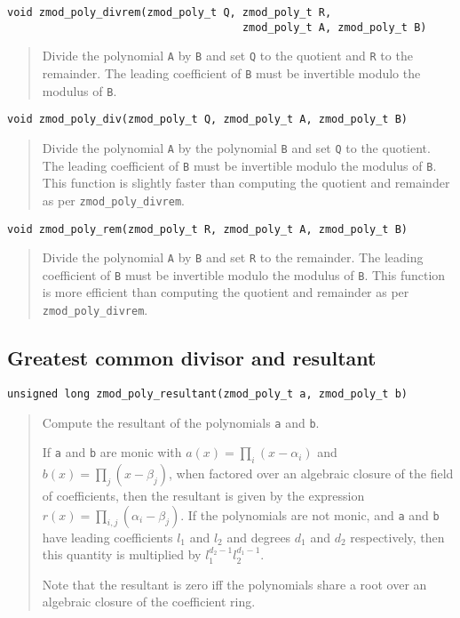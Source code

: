 \documentclass[a4paper,10pt]{article}
\newcommand{\code}{\lstinline}
\begin{document}
\begin{lstlisting}
void zmod_poly_divrem(zmod_poly_t Q, zmod_poly_t R, 
                                     zmod_poly_t A, zmod_poly_t B)
\end{lstlisting}
\begin{quote}
Divide the polynomial \code{A} by \code{B} and set \code{Q} to the quotient and \code{R} to the remainder. The leading coefficient of \code{B} must be invertible modulo the modulus of \code{B}.
\end{quote}

\begin{lstlisting}
void zmod_poly_div(zmod_poly_t Q, zmod_poly_t A, zmod_poly_t B)
\end{lstlisting}
\begin{quote}
Divide the polynomial \code{A} by the polynomial \code{B} and set \code{Q} to the quotient. The leading coefficient of \code{B} must be invertible modulo the modulus of \code{B}. This function is slightly faster than computing the quotient and remainder as per \code{zmod_poly_divrem}.
\end{quote}

\begin{lstlisting}
void zmod_poly_rem(zmod_poly_t R, zmod_poly_t A, zmod_poly_t B)
\end{lstlisting}
\begin{quote}
Divide the polynomial \code{A} by \code{B} and set \code{R} to the remainder. The leading coefficient of \code{B} must be invertible modulo the modulus of \code{B}. This function is more efficient than computing the quotient and remainder as per \code{zmod_poly_divrem}.
\end{quote}

\subsection{Greatest common divisor and resultant}
\begin{lstlisting}
unsigned long zmod_poly_resultant(zmod_poly_t a, zmod_poly_t b)
\end{lstlisting}
\begin{quote}
Compute the resultant of the polynomials \code{a} and \code{b}. 

If \code{a} and \code{b} are monic with $a(x) = \prod_i (x - \alpha_i)$ and $b(x) = \prod_j (x - \beta_j)$, when factored over an algebraic closure of the field of coefficients, then the resultant is given by the expression $r(x) = \prod_{i,j} (\alpha_i - \beta_j)$. If the polynomials are not monic, and \code{a} and \code{b} have leading coefficients $l_1$ and $l_2$ and degrees $d_1$ and $d_2$ respectively, then this quantity is multiplied by $l_1^{d_2-1}l_2^{d_1-1}$.

Note that the resultant is zero iff the polynomials share a root over an algebraic closure of the coefficient ring.

\end{quote}
\end{document}

